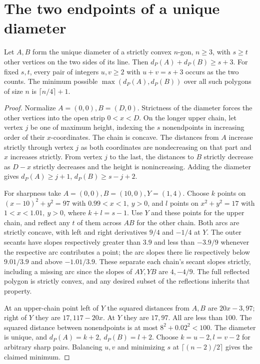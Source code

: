 \section{The two endpoints of a unique diameter}

\begin{theorem}[982-X01]
Let \(A,B\) form the unique diameter of a strictly convex \(n\)-gon, \(n\ge3\), with \(s\ge t\) other vertices on the two sides of its line. Then \(d_P(A)+d_P(B)\ge s+3\). For fixed \(s,t\), every pair of integers \(u,v\ge2\) with \(u+v=s+3\) occurs as the two counts. The minimum possible \(\max(d_P(A),d_P(B))\) over all such polygons of size \(n\) is \(\lceil n/4\rceil+1\).
\end{theorem}

\begin{proof}
Normalize \(A=(0,0), B=(D,0)\). Strictness of the diameter forces the other vertices into the open strip \(0<x<D\). On the longer upper chain, let vertex \(j\) be one of maximum height, indexing the \(s\) nonendpoints in increasing order of their \(x\)-coordinates. The chain is concave. The distances from \(A\) increase strictly through vertex \(j\) as both coordinates are nondecreasing on that part and \(x\) increases strictly. From vertex \(j\) to the last, the distances to \(B\) strictly decrease as \(D-x\) strictly decreases and the height is nonincreasing. Adding the diameter gives \(d_P(A)\ge j+1\), \(d_P(B)\ge s-j+2\).

For sharpness take \(A=(0,0), B=(10,0), Y=(1,4)\). Choose \(k\) points on \((x-10)^2+y^2=97\) with \(0.99<x<1,\ y>0\), and \(l\) points on \(x^2+y^2=17\) with \(1<x<1.01,\ y>0\), where \(k+l=s-1\). Use \(Y\) and these points for the upper chain, and reflect any \(t\) of them across \(AB\) for the other chain. Both arcs are strictly concave, with left and right derivatives \(9/4\) and \(-1/4\) at \(Y\). The outer secants have slopes respectively greater than \(3.9\) and less than \(-3.9/9\) whenever the respective arc contributes a point; the arc slopes there lie respectively below \(9.01/3.9\) and above \(-1.01/3.9\). These separate each chain's secant slopes strictly, including a missing arc since the slopes of \(AY,YB\) are \(4,-4/9\). The full reflected polygon is strictly convex, and any desired subset of the reflections inherits that property.

At an upper-chain point left of \(Y\) the squared distances from \(A,B\) are \(20x-3,97\); right of \(Y\) they are \(17,117-20x\). At \(Y\) they are \(17,97\). All are less than \(100\). The squared distance between nonendpoints is at most \(8^2+0.02^2<100\). The diameter is unique, and \(d_P(A)=k+2,\ d_P(B)=l+2\). Choose \(k=u-2,l=v-2\) for arbitrary sharp pairs. Balancing \(u,v\) and minimizing \(s\) at \(\lceil(n-2)/2\rceil\) gives the claimed minimum.
\end{proof}

